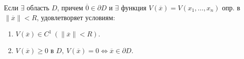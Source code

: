 \begin{theorem}
	Если $\exists $ область $D$, причем $\overline{0} \in \partial D$ и $\exists $ функция $V(\overline{x} ) = V(x_1,\ldots ,x_n)$ опр. в $\|\overline{x} \| < R$, удовлетворяет условиям:
	\begin{enumerate}
		\item $V(\overline{x} )\in C^1 \ (\|\overline{x} \| < R)$.
		\item $V(\overline{x} )\geqslant 0$ в $D, \ V(\overline{x} ) = 0 \iff \overline{x} \in \partial D$.
	\end{enumerate}
\end{theorem}
